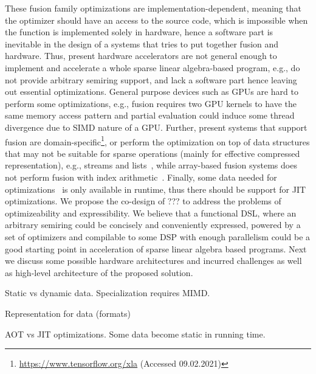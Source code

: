 \documentclass[10pt,conference]{IEEEtran}
\newcommand\question[1]{{\color{violet}#1}}
\newcommand\todo[1]{{\color{red}#1}}
\begin{document}
These fusion family optimizations are implementation-dependent, meaning that the optimizer should have an access to the source code, which is impossible when the function is implemented solely in hardware, hence a software part is inevitable in the design of a systems that tries to put together fusion and hardware.
Thus, present hardware accelerators are not general enough to implement and accelerate a whole sparse linear algebra-based program, e.g., do not provide arbitrary semiring support, and lack a software part hence leaving out essential optimizations.
General purpose devices such as GPUs are hard to perform some optimizations, e.g., fusion requires two GPU kernels to have the same memory access pattern and partial evaluation could induce some thread divergence due to SIMD nature of a GPU. 
Further, present systems that support fusion are domain-specific\footnote{\url{https://www.tensorflow.org/xla} (Accessed 09.02.2021)}, or perform the optimization on top of data structures that may not be suitable for sparse operations (mainly for effective compressed representation), e.g., streams and lists~\cite{StreamFusion,StreamFusion2}, while array-based fusion systems does not perform fusion with index arithmetic~\cite{Futhark}.
Finally, some data needed for optimizations~\cite{jones} is only available in runtime, thus there should be support for JIT optimizations.
\question{
We propose the co-design of \todo{???} to address the problems of optimizeability and expressibility.
We believe that a functional DSL, where an arbitrary semiring could be concisely and conveniently expressed, powered by a set of optimizers and compilable to some DSP with enough parallelism could be a good starting point in acceleration of sparse linear algebra based programs.
Next we discuss some possible hardware architectures and incurred challenges as well as high-level architecture of the proposed solution.
}


\todo{Static vs dynamic data.}
\todo{Specialization requires MIMD.}

\todo{Representation for data (formats)}

\todo{AOT vs JIT optimizations.} 
\todo{Some data become static in running time.} 


\end{document}
